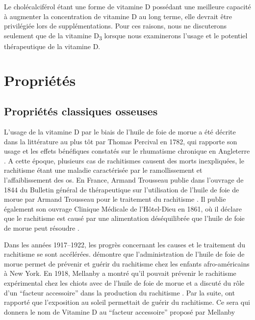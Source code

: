 \documentclass[
  a4paper,
  DIV=11,
  numbers=noendperiod,
  listof=totoc]{scrreprt}
\begin{document}
Le cholécalciférol étant une forme de vitamine D possédant une meilleure
capacité à augmenter la concentration de vitamine D au long terme, elle
devrait être privilégiée lors de supplémentations. Pour ces raisons,
nous ne discuterons seulement que de la vitamine D\textsubscript{3}
lorsque nous examinerons l'usage et le potentiel thérapeutique de la
vitamine D.

\hypertarget{propriuxe9tuxe9s}{%
\section{Propriétés}\label{propriuxe9tuxe9s}}

\hypertarget{propriuxe9tuxe9s-classiques-osseuses}{%
\subsection{Propriétés classiques
osseuses}\label{propriuxe9tuxe9s-classiques-osseuses}}

L'usage de la vitamine D par le biais de l'huile de foie de morue a été
décrite dans la littérature au plus tôt par Thomas Percival en 1782, qui
rapporte son usage et les effets bénéfiques constatés sur le rhumatisme
chronique en Angleterre \autocite{Percival.1782}. A cette époque,
plusieurs cas de rachitismes causent des morts inexpliquées, le
rachitisme étant une maladie caractérisée par le ramollissement et
l'affaiblissement des os. En France, Armand Trousseau publie dans
l'ouvrage de 1844 du Bulletin général de thérapeutique sur l'utilisation
de l'huile de foie de morue par Armand Trousseau pour le traitement du
rachitisme \autocite{bulletin.label.1844}. Il publie également son
ouvrage Clinique Médicale de l'Hôtel-Dieu en 1861, où il déclare que le
rachitisme est causé par une alimentation déséquilibrée que l'huile de
foie de morue peut résoudre \autocite{Hernigou.2019}.

Dans les années 1917--1922, les progrès concernant les causes et le
traitement du rachitisme se sont accélérées. \textcite{Hess.1917}
démontre que l'administration de l'huile de foie de morue permet de
prévenir et guérir du rachitisme chez les enfants afro-américains à New
York. En 1918, Mellanby a montré qu'il pouvait prévenir le rachitisme
expérimental chez les chiots avec de l'huile de foie de morue et a
discuté du rôle d'un ``facteur accessoire'' dans la production du
rachitisme \autocite{ORiordan.2014}. Par la suite, \textcite{Hess.1921}
ont rapporté que l'exposition au soleil permettait de guérir du
rachitisme. Ce sera \textcite{McCollum.1922} qui donnera le nom de
Vitamine D au ``facteur accessoire'' proposé par Mellanby
\autocite{Hernigou.2019,Mavrotas.2021}
\end{document}
